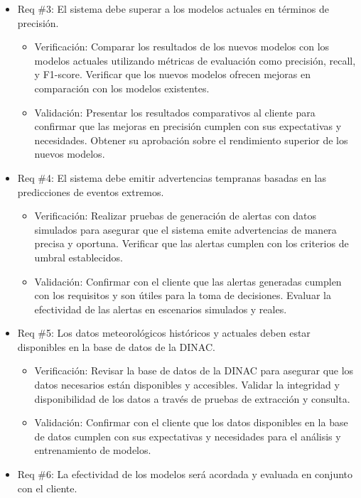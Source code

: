 \documentclass[
11pt, %
codirector, %
]{charter}
\begin{document}
\begin{itemize}
\item Req \#3: El sistema debe superar a los modelos actuales en términos de precisión.

\begin{itemize}
	\item Verificación: Comparar los resultados de los nuevos modelos con los modelos actuales utilizando métricas de evaluación como precisión, recall, y F1-score. Verificar que los nuevos modelos ofrecen mejoras en comparación con los modelos existentes.
	\item Validación: Presentar los resultados comparativos al cliente para confirmar que las mejoras en precisión cumplen con sus expectativas y necesidades. Obtener su aprobación sobre el rendimiento superior de los nuevos modelos.
\end{itemize}

\item Req \#4: El sistema debe emitir advertencias tempranas basadas en las predicciones de eventos extremos.

\begin{itemize}
	\item Verificación: Realizar pruebas de generación de alertas con datos simulados para asegurar que el sistema emite advertencias de manera precisa y oportuna. Verificar que las alertas cumplen con los criterios de umbral establecidos.
	\item Validación: Confirmar con el cliente que las alertas generadas cumplen con los requisitos y son útiles para la toma de decisiones. Evaluar la efectividad de las alertas en escenarios simulados y reales.
\end{itemize}

\item Req \#5: Los datos meteorológicos históricos y actuales deben estar disponibles en la base de datos de la DINAC.

\begin{itemize}
	\item Verificación: Revisar la base de datos de la DINAC para asegurar que los datos necesarios están disponibles y accesibles. Validar la integridad y disponibilidad de los datos a través de pruebas de extracción y consulta.
	\item Validación: Confirmar con el cliente que los datos disponibles en la base de datos cumplen con sus expectativas y necesidades para el análisis y entrenamiento de modelos.
\end{itemize}

\item Req \#6: La efectividad de los modelos será acordada y evaluada en conjunto con el cliente.


\end{itemize}
\end{document}
